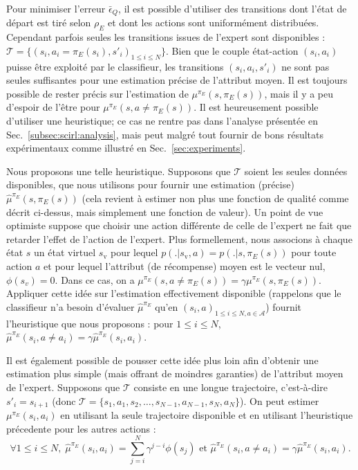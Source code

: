 \documentclass[english,utf8]{./hermes-journal}
\newcommand{\A}{\mathcal{A}}
\newcommand{\T}{\mathcal{T}}
\begin{document}
Pour minimiser l'erreur $\bar{\epsilon}_Q$, il est possible d'utiliser des transitions dont l'état de départ est tiré selon 
$\rho_E$ et dont les actions sont uniformément distribuées. Cependant parfois seules les transitions issues de l'expert sont disponibles : $\T =
\{(s_i,a_i=\pi_E(s_i),s'_i)_{1\leq i \leq N}\}$. Bien que le couple état-action $(s_i,a_i)$ puisse être exploité par le classifieur, les transitions $(s_i,a_i,s'_i)$ ne sont pas seules suffisantes pour une estimation précise de l'attribut moyen. Il est toujours possible de rester précis sur l'estimation de $\mu^{\pi_E}(s,\pi_E(s))$, mais il y a peu d'espoir de l'être pour $\mu^{\pi_E}(s,a\neq\pi_E(s))$. Il est heureusement possible d'utiliser une heuristique; ce cas ne rentre pas dans l'analyse présentée en 
Sec.~\ref{subsec:scirl:analysis}, mais peut malgré tout fournir de bons résultats expérimentaux comme illustré en Sec.~\ref{sec:experiments}.


Nous proposons une telle heuristique. Supposons que  $\T$ soient les seules données disponibles, que nous utilisons pour fournir une estimation (précise)
$\hat{\mu}^{\pi_E}(s,\pi_E(s))$ (cela revient à estimer non plus une fonction de qualité comme décrit ci-dessus, mais simplement une fonction de valeur). Un point de vue optimiste suppose que choisir une action différente de celle de l'expert ne fait que retarder l'effet de l'action de l'expert. Plus formellement, nous associons à chaque état $s$ un état virtuel $s_\text{v}$ pour lequel $p(.|s_\text{v},a)=p(.|s,\pi_E(s))$ pour toute action $a$ et pour lequel l'attribut (de récompense) moyen est le vecteur nul, $\phi(s_v) = 0$. Dans ce cas, on a
$\mu^{\pi_E}(s,a\neq\pi_E(s)) = \gamma \mu^{\pi_E}(s,\pi_E(s))$.
Appliquer cette idée sur l'estimation effectivement disponible (rappelons que le classifieur n'a besoin d'évaluer  $\hat{\mu}^{\pi_E}$ qu'en
$(s_i,a)_{1\leq i\leq N,a\in \A}$) fournit l'heuristique que nous proposons :
pour $1\leq i\leq N$, $\hat{\mu}^{\pi_E}(s_i,a\neq a_i) = \gamma
\hat{\mu}^{\pi_E}(s_i,a_i)$.

Il est également possible de pousser cette idée plus loin afin d'obtenir une estimation plus simple (mais offrant de moindres garanties) de l'attribut moyen de l'expert.
Supposons que  $\T$ consiste en une longue trajectoire, c'est-à-dire
$s'_i = s_{i+1}$ (donc $\T =
\{s_1,a_1,s_2,\dots,s_{N-1},a_{N-1},s_N,a_N\}$). On peut estimer
$\mu^{\pi_E}(s_i,a_i)$ en utilisant la seule trajectoire disponible et en utilisant l'heuristique précedente pour les autres actions :
\begin{equation}
  \forall 1\leq i \leq N,\; \hat{\mu}^{\pi_E}(s_i,a_i) =
  \sum_{j=i}^N \gamma^{j-i}\phi(s_j) \text{ et }
  \hat{\mu}^{\pi_E}(s_i,a\neq a_i) = \gamma
  \hat{\mu}^{\pi_E}(s_i,a_i).
  \label{eq:mc_plus_heuristic}
\end{equation}
\end{document}
